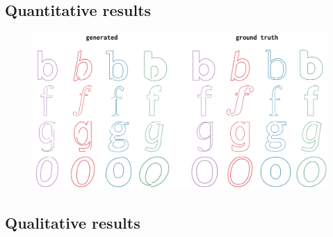 \subsection{Quantitative results}
\begin{figure}[t]
	\includegraphics[width=\textwidth]{figures/font_gen}
    \caption[Visual results of training ]
    {\label{fig:font_gen}}
\end{figure}

\subsection{Qualitative results}

